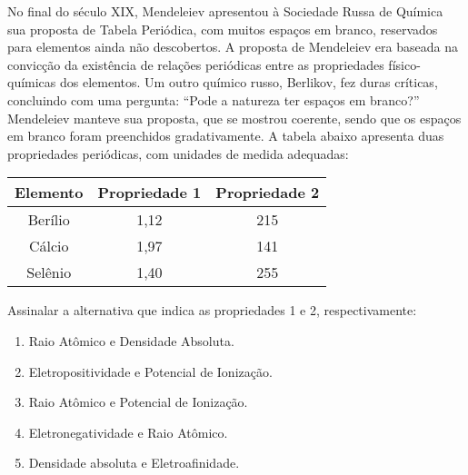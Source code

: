 No final do século XIX,  Mendeleiev apresentou à Sociedade Russa de Química sua proposta de Tabela Periódica, com muitos espaços em branco, reservados para elementos ainda não descobertos. A proposta de Mendeleiev era baseada na convicção da existência de relações periódicas entre as propriedades físico-químicas dos elementos. Um outro químico russo,  Berlikov, fez duras críticas, concluindo com uma pergunta: “Pode a natureza ter espaços em branco?” Mendeleiev manteve sua proposta, que se mostrou coerente, sendo que os espaços em branco foram preenchidos gradativamente. A tabela abaixo apresenta duas propriedades periódicas, com unidades de medida adequadas: 

\begin{center}
\renewcommand{\arraystretch}{1.5}
\begin{tabular}{|c|c|c|}
	\hline
	\textbf{Elemento} & \textbf{Propriedade 1} & \textbf{Propriedade 2}\\\hline
	Berílio & 1,12 & 215\\\hline
	Cálcio & 1,97 & 141\\\hline
	Selênio & 1,40 & 255 \\\hline
\end{tabular}
\end{center}

Assinalar a alternativa que indica as propriedades 1 e 2, respectivamente: 

\begin{enumerate}[label = (\alph*)]
	
	\item Raio Atômico e Densidade Absoluta.
	\item Eletropositividade e Potencial de Ionização.
	\item Raio Atômico e Potencial de Ionização.
	\item Eletronegatividade e Raio Atômico. 
	\item Densidade absoluta e Eletroafinidade.
\end{enumerate}
